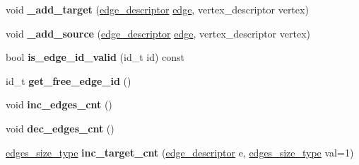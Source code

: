 \begin{DoxyCompactItemize}
void {\bfseries \+\_\+add\+\_\+target} (\hyperlink{class_s_p_u___g_r_a_p_h_1_1_spu_ultra_graph_a5f3776e003ef0a1648f1d9f84289810b}{edge\+\_\+descriptor} \hyperlink{class_s_p_u___g_r_a_p_h_1_1_spu_ultra_graph_a51468aa2278d3abb0c338ffbeac7747a}{edge}, vertex\+\_\+descriptor vertex)
\item 
\mbox{\label{class_s_p_u___g_r_a_p_h_1_1_spu_ultra_graph_a2434edd7a6f1b35ea9e67379a4c12ddd}} 
void {\bfseries \+\_\+add\+\_\+source} (\hyperlink{class_s_p_u___g_r_a_p_h_1_1_spu_ultra_graph_a5f3776e003ef0a1648f1d9f84289810b}{edge\+\_\+descriptor} \hyperlink{class_s_p_u___g_r_a_p_h_1_1_spu_ultra_graph_a51468aa2278d3abb0c338ffbeac7747a}{edge}, vertex\+\_\+descriptor vertex)
\item 
\mbox{\label{class_s_p_u___g_r_a_p_h_1_1_spu_ultra_graph_a53da0a5c180690322919dacfc635da8c}} 
bool {\bfseries is\+\_\+edge\+\_\+id\+\_\+valid} (id\+\_\+t id) const
\item 
\mbox{\label{class_s_p_u___g_r_a_p_h_1_1_spu_ultra_graph_a147a1360ecb5b9076f9d39fd8b535ae7}} 
id\+\_\+t {\bfseries get\+\_\+free\+\_\+edge\+\_\+id} ()
\item 
\mbox{\label{class_s_p_u___g_r_a_p_h_1_1_spu_ultra_graph_a30fb4596eff47c3a37e4877ffccb673c}} 
void {\bfseries inc\+\_\+edges\+\_\+cnt} ()
\item 
\mbox{\label{class_s_p_u___g_r_a_p_h_1_1_spu_ultra_graph_afcdcd8d58cb37290e5bb6463b41917b4}} 
void {\bfseries dec\+\_\+edges\+\_\+cnt} ()
\item 
\mbox{\label{class_s_p_u___g_r_a_p_h_1_1_spu_ultra_graph_afbba9ab825107d30abaad6ad755181dc}} 
\hyperlink{class_s_p_u___g_r_a_p_h_1_1_spu_ultra_graph_a82496f8d87c7dfab766f15a989a05aa4}{edges\+\_\+size\+\_\+type} {\bfseries inc\+\_\+target\+\_\+cnt} (\hyperlink{class_s_p_u___g_r_a_p_h_1_1_spu_ultra_graph_a5f3776e003ef0a1648f1d9f84289810b}{edge\+\_\+descriptor} e, \hyperlink{class_s_p_u___g_r_a_p_h_1_1_spu_ultra_graph_a82496f8d87c7dfab766f15a989a05aa4}{edges\+\_\+size\+\_\+type} val=1)
\item 

\end{DoxyCompactItemize}
